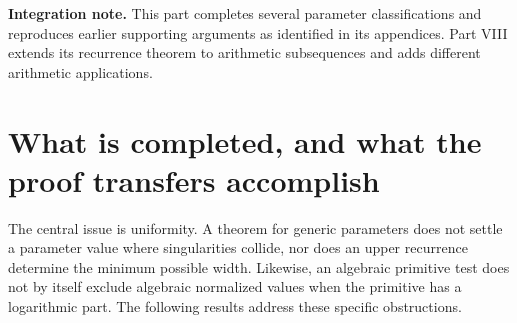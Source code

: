 \documentclass[11pt,a4paper]{article}
\theoremstyle{definition}
\theoremstyle{remark}
\numberwithin{equation}{section}
\begin{document}
\begin{abstract}
We extend three proof mechanisms from preceding manuscripts to parameter
regimes in which generic arguments leave exceptional cases unresolved.
First, a finite-cover ramification bound, collision multiplicities, and
an elementary reflection argument determine the full orthogonal
differential Galois group of every odd-dimensional hypercubic period
and every even-propagator banana period, for all nonzero complex weights.
Combined with the previously established opposite-parity symplectic
theorems, this gives both complete parity classifications.
Second, a multiplicity-preserving formal-exponential budget proves the
minimum recurrence width of every weighted central binomial power sum:
it is $\lceil r/2\rceil$ at weight $1$, $\lfloor r/2\rfloor$ at weight
$-1$, and $r$ at every other nonzero complex weight, for all $r\ge2$.
Third, for complementary rational beta exponents other than $1/2$,
one explicit coefficient functional of a polynomial weight determines
whether every algebraic-level quantile is algebraic or every such
quantile is transcendental, on every algebraic truncation interval.
Finally, a universal lower bound shows why unrestricted heteroscedastic
mixture maximum likelihood cannot have expected transport consistency
under arbitrary noise profiles, even when consistent estimation remains
possible. Supporting results from the preceding work are identified and
partly reproduced. These are mathematical claims with proofs and internal
checks, not claims of established historical priority or completed
external validation.
\end{abstract}

\noindent\textbf{Integration note.} This part completes several parameter classifications and reproduces earlier supporting arguments as identified in its appendices. Part VIII extends its recurrence theorem to arithmetic subsequences and adds different arithmetic applications.
\clearpage

\section{What is completed, and what the proof transfers accomplish}
\label{p7:intro:section}

The central issue is uniformity. A theorem for generic parameters does
not settle a parameter value where singularities collide, nor does
an upper recurrence determine the minimum possible width. Likewise,
an algebraic primitive test does not by itself exclude algebraic
normalized values when the primitive has a logarithmic part.
The following results address these specific obstructions.
\end{document}
